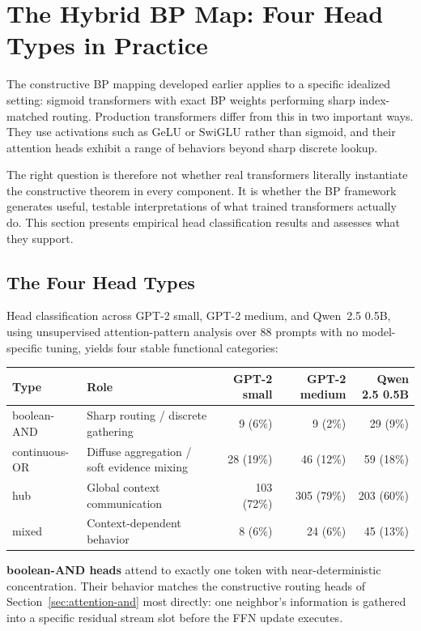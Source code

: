 \section{The Hybrid BP Map: Four Head Types in Practice}
\label{sec:hybrid-bp}

The constructive BP mapping developed earlier applies to a specific idealized setting: sigmoid transformers with exact BP weights performing sharp index-matched routing. Production transformers differ from this in two important ways. They use activations such as GeLU or SwiGLU rather than sigmoid, and their attention heads exhibit a range of behaviors beyond sharp discrete lookup.

The right question is therefore not whether real transformers literally instantiate the constructive theorem in every component. It is whether the BP framework generates useful, testable interpretations of what trained transformers actually do. This section presents empirical head classification results and assesses what they support.

\subsection*{The Four Head Types}

Head classification across GPT-2 small, GPT-2 medium, and Qwen~2.5 0.5B, using unsupervised attention-pattern analysis over 88 prompts with no model-specific tuning, yields four stable functional categories:

\begin{center}
\begin{tabular}{llrrr}
\toprule
Type & Role & GPT-2 small & GPT-2 medium & Qwen 2.5 0.5B \\
\midrule
boolean-AND & Sharp routing / discrete gathering & 9 (6\%) & 9 (2\%) & 29 (9\%) \\
continuous-OR & Diffuse aggregation / soft evidence mixing & 28 (19\%) & 46 (12\%) & 59 (18\%) \\
hub & Global context communication & 103 (72\%) & 305 (79\%) & 203 (60\%) \\
mixed & Context-dependent behavior & 8 (6\%) & 24 (6\%) & 45 (13\%) \\
\bottomrule
\end{tabular}
\end{center}

\textbf{boolean-AND heads} attend to exactly one token with near-deterministic concentration. Their behavior matches the constructive routing heads of Section~\ref{sec:attention-and} most directly: one neighbor's information is gathered into a specific residual stream slot before the FFN update executes.

